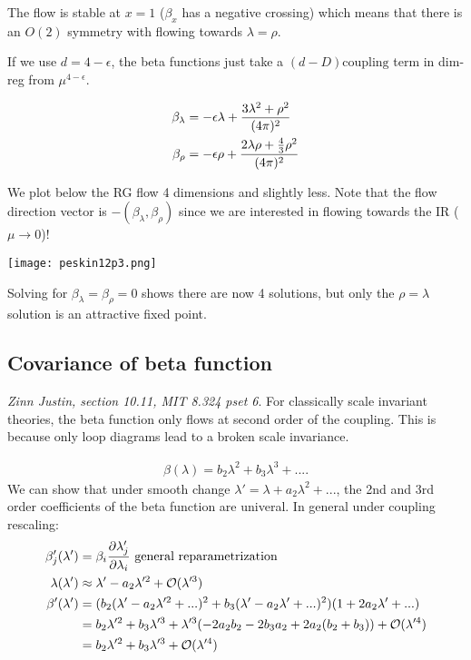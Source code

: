 \documentclass[9pt]{scrartcl}
\begin{document}
The flow is stable at $x=1$ ($\beta_x$ has a negative crossing) which means that there is an  $O(2)$ symmetry with flowing towards $\lambda = \rho$.

If we use $d = 4-\epsilon$, the beta functions just take a $(d-D) \text{coupling}$ term in dim-reg from $\mu^{4 -\epsilon}$.

\begin{align}
	\beta_\lambda  &= -\epsilon \lambda + {3 \lambda^2  + {\rho^2} \over (4 \pi)^2} \\
	\beta_\rho & = - \epsilon \rho + {2 \lambda \rho + {4 \over 3} \rho^2 \over (4 \pi)^2}
	\end{align}

We plot below the RG flow 4 dimensions and slightly less.  Note that the flow direction vector is $- (\beta_\lambda, \beta_\rho)$ since we are interested in flowing towards the IR ($\mu \rightarrow 0$)!

\texttt{[image: peskin12p3.png]}

Solving for $\beta_\lambda = \beta_\rho = 0$ shows there are now 4 solutions, but only the $\rho = \lambda$ solution is an attractive fixed point.

\subsection{Covariance of beta function}
\emph{Zinn Justin, section 10.11, MIT 8.324 pset 6}.
For classically scale invariant theories, the beta function only flows at second order
of the coupling.  This is because only loop diagrams lead to a broken scale invariance. 

\begin{align}
	\beta(\lambda) = b_2 \lambda^2 + b_3 \lambda^3 + ....
	\end{align}
We can show that under smooth change $\lambda' = \lambda + a_2 \lambda^2 + ...$, the 2nd and 3rd order coefficients of the beta function are univeral.
In general under coupling rescaling:
\begin{align}
	\beta'_j(\lambda') &= \beta_i {\partial \lambda_j' \over \partial \lambda_i} \text{  general reparametrization} \\
	\lambda(\lambda') & \approx \lambda' - a_2 \lambda'^2 + \mathcal{O}(\lambda'^3) \\
	\beta'(\lambda') &= (b_2 (\lambda' - a_2 \lambda'^2 + ...)^2 + b_3 (\lambda' - a_2 \lambda' + ...)^2 ) (1 + 2 a_2 \lambda' + ... ) \\
	& = b_2 \lambda'^2 + b_3 \lambda'^3 + \lambda'^3 (- 2 a_2 b_2 - 2 b_3 a_2 + 2 a_2 (b_2 + b_3)) + \mathcal{O}(\lambda'^4) \\
	&= b_2 \lambda'^2 + b_3 \lambda'^3 + \mathcal{O}(\lambda'^4)
	\end{align}
\end{document}
